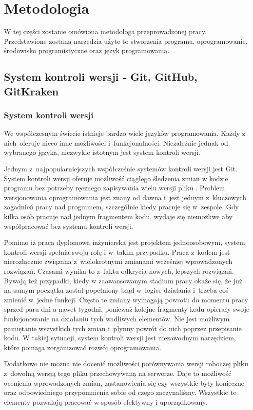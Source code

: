 \documentclass[eng,printmode]{mgr}
\begin{document}
\chapter{Metodologia} \label{metodologia}
W tej części zostanie omówiona metodologa przeprowadzonej pracy. Przedstawione zostaną narzędzia użyte to stworzenia programu, oprogramowanie, środowisko programistyczne oraz język programowania.
\section{System kontroli wersji - Git, GitHub, GitKraken}
\subsection{System kontroli wersji}
We współczesnym świecie istnieje bardzo wiele języków programowania. Każdy z nich~oferuje nieco inne możliwości i~funkcjonalności. Niezależnie jednak od wybranego języka, niezwykle istotnym jest system kontroli wersji. 

Jednym z~najpopularniejszych współcześnie systemów kontroli wersji jest Git. System kontroli wersji oferuje możliwość ciągłego śledzenia zmian w kodzie programu bez potrzeby ręcznego zapisywania wielu wersji pliku \cite{Git}. Problem wersjonowania oprogramowania jest znany od dawna i~jest jednym z~kluczowych zagadnień pracy nad programem, szczególnie kiedy pracuje się w~zespole. Gdy kilka osób pracuje nad jednym fragmentem kodu, wydaje się niemożliwe aby współpracować bez systemu kontroli wersji.

Pomimo iż praca dyplomowa inżynierska jest projektem jednoosobowym, system kontroli wersji spełnia swoją rolę i w~takim przypadku. Praca z~kodem jest nierozłącznie związana z~wielokrotnymi zmianami wcześniej wprowadzonych rozwiązań. Czasami wynika to z~faktu odkrycia nowych, lepszych rozwiązań. Bywają też przypadki, kiedy w zaawansowanym stadium pracy okaże się, że już na samym początku został popełniony błąd w~logice działania i~trzeba coś zmienić w~jedne funkcji. Często te zmiany wymagają powrotu do momentu pracy sprzed paru dni a nawet tygodni, ponieważ kolejne fragmenty kodu opierały swoje funkcjonowanie na działaniu tych wadliwych elementów. Nie jest możliwym pamiętanie wszystkich tych zmian i~płynny powrót do nich poprzez przepisanie kodu. W takiej sytuacji, system kontroli wersji jest niezawodnym narzędziem, które pomaga zorganizować rozwój oprogramowania. 

Dodatkowo nie można nie docenić możliwości porównywania wersji roboczej pliku z~dowolną wersją tego pliku przechowywaną na serwerze. Daje to możliwość ocenienia wprowadzonych zmian, zastanowienia się czy wszystkie były konieczne oraz odpowiedniego przypomnienia sobie od czego zaczynaliśmy. Wszystkie te elementy pozwalają pracować w sposób efektywny i uporządkowany.
\end{document}
